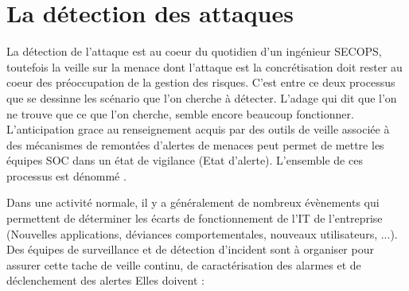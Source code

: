 \section{La détection des attaques}

La détection de l'attaque est au coeur du quotidien d'un ingénieur SECOPS, toutefois la veille sur la menace dont l'attaque est la concrétisation doit rester au coeur des préoccupation de la gestion des risques. C'est entre ce deux processus que se dessinne les scénario que l'on cherche à détecter. L'adage qui dit que l'on ne trouve que ce que l'on cherche, semble encore beaucoup fonctionner.  L'anticipation grace au renseignement acquis par des outils de veille associée à des mécanismes de remontées d'alertes de menaces peut permet de mettre les équipes SOC dans un état de vigilance (Etat d'alerte). L'ensemble de ces processus  est dénommé .

Dans une activité normale, il y a généralement de nombreux évènements qui permettent de déterminer les écarts  de fonctionnement de l'IT de l'entreprise (Nouvelles applications, déviances comportementales, nouveaux utilisateurs, ...). Des équipes de surveillance et de détection d'incident sont à organiser pour assurer cette tache de veille continu, de caractérisation des alarmes et de déclenchement des alertes Elles doivent :

